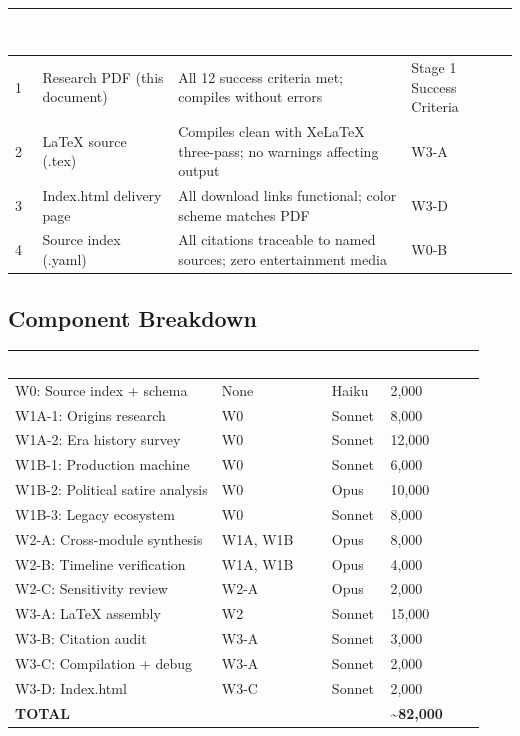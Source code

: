 \documentclass[11pt,letterpaper]{article}
\newcommand{\tableheader}[1]{\textbf{\sffamily\textcolor{white}{#1}}}
\begin{document}
\begin{center}
\begin{tabularx}{\textwidth}{C{0.5cm}L{3.5cm}XL{2.5cm}}
\toprule
{}
\tableheader{\#} & \tableheader{Deliverable} & \tableheader{Acceptance Criteria} & \tableheader{Spec Location} \\
 & Research PDF (this document) & All 12 success criteria met; compiles without errors & Stage 1 Success Criteria \\
2 & LaTeX source (.tex) & Compiles clean with XeLaTeX three-pass; no warnings affecting output & W3-A \\
3 & Index.html delivery page & All download links functional; color scheme matches PDF & W3-D \\
4 & Source index (.yaml) & All citations traceable to named sources; zero entertainment media & W0-B \\
\bottomrule
\end{tabularx}
\end{center}

\subsection{Component Breakdown}

\begin{center}
\begin{tabularx}{\textwidth}{L{3.5cm}L{2.5cm}C{1.5cm}C{2cm}}
\toprule
{}
\tableheader{Component} & \tableheader{Dependencies} & \tableheader{Model} & \tableheader{Est. Tokens} \\
\midrule
W0: Source index + schema & None & Haiku & 2,000 \\
W1A-1: Origins research & W0 & Sonnet & 8,000 \\
W1A-2: Era history survey & W0 & Sonnet & 12,000 \\
W1B-1: Production machine & W0 & Sonnet & 6,000 \\
W1B-2: Political satire analysis & W0 & Opus & 10,000 \\
W1B-3: Legacy ecosystem & W0 & Sonnet & 8,000 \\
W2-A: Cross-module synthesis & W1A, W1B & Opus & 8,000 \\
W2-B: Timeline verification & W1A, W1B & Opus & 4,000 \\
W2-C: Sensitivity review & W2-A & Opus & 2,000 \\
W3-A: LaTeX assembly & W2 & Sonnet & 15,000 \\
W3-B: Citation audit & W3-A & Sonnet & 3,000 \\
W3-C: Compilation + debug & W3-A & Sonnet & 2,000 \\
W3-D: Index.html & W3-C & Sonnet & 2,000 \\
\textbf{TOTAL} & & & \textbf{\textasciitilde{}82,000} \\
\bottomrule
\end{tabularx}
\end{center}
\end{document}
